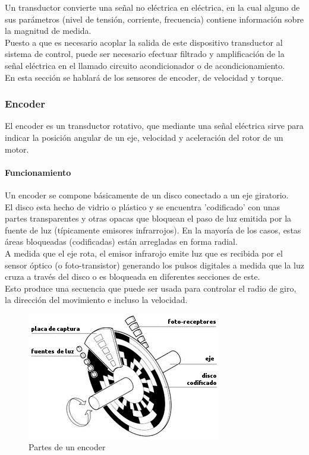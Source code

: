 \documentclass[12pt,titlepage]{article}
\begin{document}
Un transductor convierte una señal no eléctrica en eléctrica, en la cual alguno de sus parámetros (nivel de tensión, corriente, frecuencia) contiene información sobre la magnitud de medida. \\ Puesto a que es necesario acoplar la salida de este dispositivo transductor al sistema de control, puede ser necesario efectuar filtrado y amplificación de la señal eléctrica en el llamado circuito acondicionador o de acondicionamiento. \\[0.8mm] 

En esta sección se hablará de los sensores de encoder, de velocidad y torque. \\ 
\subsubsection{Encoder}
El encoder es un transductor rotativo, que mediante una señal eléctrica sirve para indicar la posición angular de un eje, velocidad y aceleración del rotor de un motor. \\[0.8mm]

\paragraph{Funcionamiento}\leavevmode\newline 
Un encoder se compone básicamente de un disco conectado a un eje giratorio.\\
El disco esta hecho de vidrio o plástico y se encuentra 'codificado' con unas partes transparentes y otras opacas que bloquean el paso de luz emitida por la fuente de luz (típicamente emisores infrarrojos). En la mayoría de los casos, estas áreas bloqueadas (codificadas) están arregladas en forma radial. \\[0.8mm] 

A medida que el eje rota, el emisor infrarojo emite luz que es recibida por el sensor óptico (o foto-transistor) generando los pulsos digitales a medida que la luz cruza a través del disco o es bloqueada en diferentes secciones de este. \\[0.8mm]
Esto produce una secuencia que puede ser usada para controlar el radio de giro, la dirección del movimiento e incluso la velocidad. 
\newpage

\begin{figure}[htbp]
\hspace*{3.5cm} 
\includegraphics[scale=0.75]{partes-encoder}
\caption{Partes de un encoder}
\end{figure}
\end{document}
